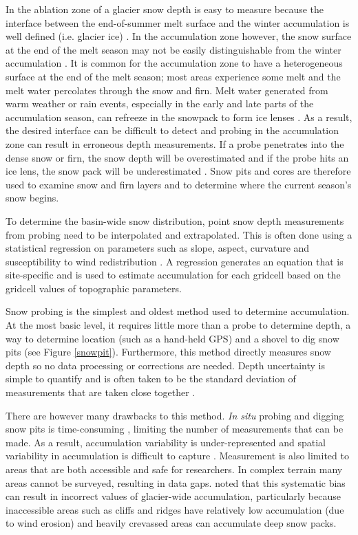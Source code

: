 \documentclass{sfuthesis}
\begin{document}
In the ablation zone of a glacier snow depth is easy to measure because the interface between the end-of-summer melt surface and the winter accumulation is well defined (i.e. glacier ice) \citep{McGrath2015}. In the accumulation zone however, the snow surface at the end of the melt season may not be easily distinguishable from the winter accumulation \citep{Grunewald2010}. It is common for the accumulation zone to have a heterogeneous surface at the end of the melt season; most areas experience some melt and the melt water percolates through the snow and firn. Melt water generated from warm weather or rain events, especially in the early and late parts of the accumulation season, can refreeze in the snowpack to form ice lenses \citep{Sold2014}. As a result, the desired interface can be difficult to detect and probing in the accumulation zone can result in erroneous depth measurements. If a probe penetrates into the dense snow or firn, the snow depth will be overestimated and if the probe hits an ice lens, the snow pack will be underestimated \citep{Sold2013}. Snow pits and cores are therefore used to examine snow and firn layers and to determine where the current season's snow begins.

To determine the basin-wide snow distribution, point snow depth measurements from probing need to be interpolated and extrapolated. This is often done using a statistical regression on parameters such as slope, aspect, curvature and susceptibility to wind redistribution \citep[e.g.][]{Wheler2014,McGrath2015}. A regression generates an equation that is site-specific and is used to estimate accumulation for each gridcell based on the gridcell values of topographic parameters. 

Snow probing is the simplest and oldest method used to determine accumulation. At the most basic level, it requires little more than a probe to determine depth, a way to determine location (such as a hand-held GPS) and a shovel to dig snow pits (see Figure \ref{snowpit}). Furthermore, this method directly measures snow depth so no data processing or corrections are needed. Depth uncertainty is simple to quantify and is often taken to be the standard deviation of measurements that are taken close together \citep{Sold2013}. 

There are however many drawbacks to this method. \textit{In situ} probing and digging snow pits is time-consuming \citep{Deems2006}, limiting the number of measurements that can be made. As a result, accumulation variability is under-represented and spatial variability in accumulation is difficult to capture \citep{Sold2014}. Measurement is also limited to areas that are both accessible and safe for researchers. In complex terrain many areas cannot be surveyed, resulting in data gaps. \cite{Sold2013} noted that this systematic bias can result in incorrect values of glacier-wide accumulation, particularly because inaccessible areas such as cliffs and ridges have relatively low accumulation (due to wind erosion) and heavily crevassed areas can accumulate deep snow packs. 
\end{document}

